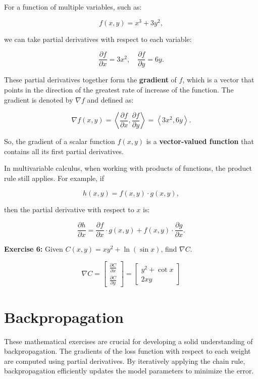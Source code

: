 For a function of multiple variables, such as:

\[
f(x, y) = x^3 + 3y^2,
\]

we can take partial derivatives with respect to each variable:

\[
\frac{\partial f}{\partial x} = 3x^2, \quad \frac{\partial f}{\partial y} = 6y.
\]

These partial derivatives together form the \textbf{gradient} of \(f\), which is a vector that points in the direction of the greatest rate of increase of the function. The gradient is denoted by \(\nabla f\) and defined as:

\[
\nabla f(x, y) = \left\langle \frac{\partial f}{\partial x}, \frac{\partial f}{\partial y} \right\rangle = \left\langle 3x^2, 6y \right\rangle.
\]

So, the gradient of a scalar function \(f(x, y)\) is a \textbf{vector-valued function} that contains all its first partial derivatives.

\bigskip

In multivariable calculus, when working with products of functions, the product rule still applies. For example, if

\[
h(x, y) = f(x, y) \cdot g(x, y),
\]

then the partial derivative with respect to \(x\) is:

\[
\frac{\partial h}{\partial x} = \frac{\partial f}{\partial x} \cdot g(x, y) + f(x, y) \cdot \frac{\partial g}{\partial x}.
\]

\textbf{Exercise 6:} Given $C(x, y) = xy^2 + \ln (\sin x)$, find $\nabla C$.

\[
\nabla C = 
\begin{bmatrix}
    \frac{\partial C}{\partial x} \\
    \frac{\partial C}{\partial y}
\end{bmatrix}
=
\begin{bmatrix}
    y^2 + \cot x \\
    2xy
\end{bmatrix}
\]

\section{Backpropagation}

These mathematical exercises are crucial for developing a solid understanding of backpropagation. The gradients of the loss function with respect to each weight are computed using partial derivatives. By iteratively applying the chain rule, backpropagation efficiently updates the model parameters to minimize the error.